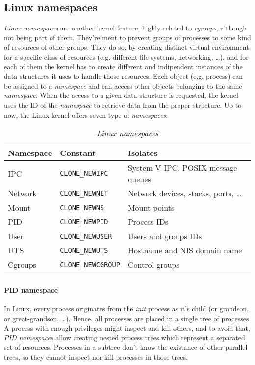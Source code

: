 \subsection{Linux namespaces}
\emph{Linux namespaces} are another kernel feature, highly related to
\emph{cgroups}, although not being part of them. They're ment to prevent
groups of processes to  some kind of resources of other groups. They do
so, by creating distinct virtual environment for a specific class of resources
(e.g. different file systems, networking, \dots), and for each of them the
kernel has to create different and indipendent instances of the data structures
it uses to handle those resources. Each object (e.g. process) can be assigned to
a \emph{namespace} and can access other objects belonging to the same
\emph{namespace}. When the access to a given data structure is requested, the
kernel uses the ID of the \emph{namespace} to retrieve data from the proper
structure. Up to now, the Linux kernel offers seven type of \emph{namespaces}:

{
    \centering
    \renewcommand{\arraystretch}{1.2}
    \begin{longtable}{|l|l|l|}
        \hline
        \textbf{Namespace} & \textbf{Constant} & \textbf{Isolates}\\
        \hline
        IPC & \texttt{CLONE\_NEWIPC} & System V IPC, POSIX message queues\\
        \hline
        Network & \texttt{CLONE\_NEWNET} & Network devices, stacks, ports, \dots\\
        \hline
        Mount & \texttt{CLONE\_NEWNS} & Mount points\\
        \hline
        PID & \texttt{CLONE\_NEWPID} & Process IDs\\
        \hline
        User & \texttt{CLONE\_NEWUSER} & Users and groups IDs\\
        \hline
        UTS & \texttt{CLONE\_NEWUTS} & Hostname and NIS domain name\\
        \hline
        Cgroups & \texttt{CLONE\_NEWCGROUP} & Control groups\\
        \hline
        \caption{\emph{Linux namespaces}}
    \end{longtable}
}

\paragraph{PID namespace}
In Linux, every process originates from the \emph{init} process as it's child
(or grandson, or great-grandson, \dots). Hence, all processes are placed in a
single tree of processes. A process with enough privileges might inspect and
kill others, and to avoid that, \emph{PID namespaces} allow creating nested
process trees which represent a separated set of resources. Processes in a
subtree don't know the existance of other parallel trees, so they cannot inspect
nor kill processes in those trees.

